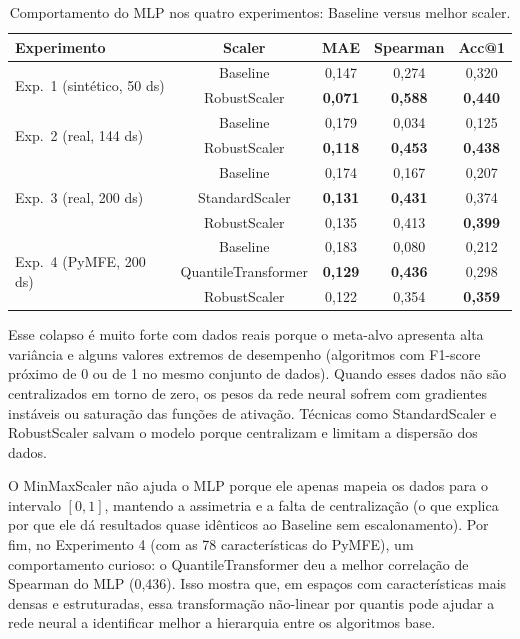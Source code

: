 \documentclass[12pt]{article}
\begin{document}
\begin{table}[ht]
\centering
\caption{Comportamento do MLP nos quatro experimentos: Baseline versus melhor scaler.}
\label{tab:mlp_comparison}
\small
\begin{tabular}{lcccc}
\toprule
\textbf{Experimento} & \textbf{Scaler} & \textbf{MAE} & \textbf{Spearman} & \textbf{Acc@1} \\
\midrule
\multirow{2}{*}{Exp.\ 1 (sintético, 50 ds)} & Baseline     & 0,147 & 0,274 & 0,320 \\
                                             & RobustScaler & \textbf{0,071} & \textbf{0,588} & \textbf{0,440} \\
\midrule
\multirow{2}{*}{Exp.\ 2 (real, 144 ds)}     & Baseline     & 0,179 & 0,034 & 0,125 \\
                                             & RobustScaler & \textbf{0,118} & \textbf{0,453} & \textbf{0,438} \\
\midrule
\multirow{3}{*}{Exp.\ 3 (real, 200 ds)}     & Baseline     & 0,174 & 0,167 & 0,207 \\
                                             & StandardScaler & \textbf{0,131} & \textbf{0,431} & 0,374 \\
                                             & RobustScaler & 0,135 & 0,413 & \textbf{0,399} \\
\midrule
\multirow{3}{*}{Exp.\ 4 (PyMFE, 200 ds)}    & Baseline     & 0,183 & 0,080 & 0,212 \\
                                             & QuantileTransformer & \textbf{0,129} & \textbf{0,436} & 0,298 \\
                                             & RobustScaler & 0,122 & 0,354 & \textbf{0,359} \\
\bottomrule
\end{tabular}
\end{table}

Esse colapso é muito forte com dados reais porque o meta-alvo apresenta alta variância e alguns valores extremos de desempenho (algoritmos com F1-score próximo de 0 ou de 1 no mesmo conjunto de dados). Quando esses dados não são centralizados em torno de zero, os pesos da rede neural sofrem com gradientes instáveis ou saturação das funções de ativação. Técnicas como StandardScaler e RobustScaler salvam o modelo porque centralizam e limitam a dispersão dos dados.

O MinMaxScaler não ajuda o MLP porque ele apenas mapeia os dados para o intervalo $[0, 1]$, mantendo a assimetria e a falta de centralização (o que explica por que ele dá resultados quase idênticos ao Baseline sem escalonamento). Por fim, no Experimento 4 (com as 78 características do PyMFE), um comportamento curioso: o QuantileTransformer deu a melhor correlação de Spearman do MLP (0,436). Isso mostra que, em espaços com características mais densas e estruturadas, essa transformação não-linear por quantis pode ajudar a rede neural a identificar melhor a hierarquia entre os algoritmos base. 
\end{document}
